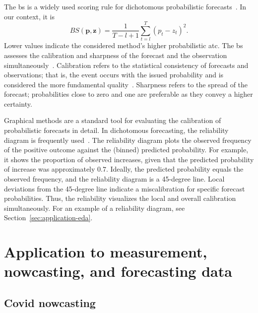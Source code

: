 \documentclass[pdflatex]{sn-jnl}
\theoremstyle{plain}%
\theoremstyle{definition}
\begin{document}
The \ac{bs} is a widely used scoring rule for dichotomous probabilistic forecasts~\citep{Brier1950}.
In our context, it is
\begin{equation*}
    BS (\mathbf{p}, \mathbf{z}) = \frac{1}{T-l+1} \sum_{t=l}^{T} (p_t - z_t)^2.
\end{equation*}
Lower values indicate the considered method's higher probabilistic \ac{atc}.
The \ac{bs} assesses the calibration and sharpness of the forecast and the observation simultaneously~\citep{Ranjan2010, Mitchell2011}.
Calibration refers to the statistical consistency of forecasts and observations; that is, the event occurs with the issued probability and is considered the more fundamental quality~\citep{Gneiting2007}.
Sharpness refers to the spread of the forecast; probabilities close to zero and one are preferable as they convey a higher certainty.

Graphical methods are a standard tool for evaluating the calibration of probabilistic forecasts in detail.
In dichotomous forecasting, the reliability diagram is frequently used~\citep{Ranjan2010}.
The reliability diagram plots the observed frequency of the positive outcome against the (binned) predicted probability.
For example, it shows the proportion of observed increases, given that the predicted probability of increase was approximately $0.7$.
Ideally, the predicted probability equals the observed frequency, and the reliability diagram is a 45-degree line.
Local deviations from the 45-degree line indicate a miscalibration for specific forecast probabilities.
Thus, the reliability visualizes the local and overall calibration simultaneously.
For an example of a reliability diagram, see Section~\ref{sec:application-eda}.


\section{Application to measurement, nowcasting, and forecasting data} \label{sec:application}

\subsection{Covid nowcasting} \label{sec:application-covid}
\end{document}
